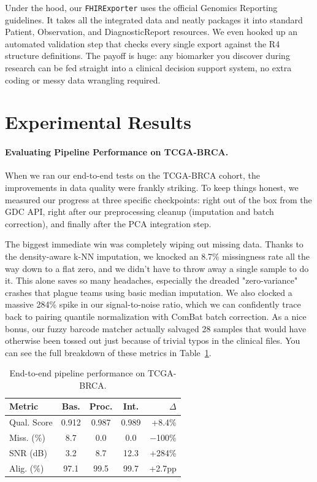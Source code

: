 \documentclass[runningheads]{llncs}
\begin{document}
Under the hood, our \texttt{FHIRExporter} uses the official Genomics Reporting guidelines. It takes all the integrated data and neatly packages it into standard Patient, Observation, and DiagnosticReport resources. We even hooked up an automated validation step that checks every single export against the R4 structure definitions. The payoff is huge: any biomarker you discover during research can be fed straight into a clinical decision support system, no extra coding or messy data wrangling required.

\section{Experimental Results}

\paragraph{Evaluating Pipeline Performance on TCGA-BRCA.}
When we ran our end-to-end tests on the TCGA-BRCA cohort, the improvements in data quality were frankly striking. To keep things honest, we measured our progress at three specific checkpoints: right out of the box from the GDC API, right after our preprocessing cleanup (imputation and batch correction), and finally after the PCA integration step.

The biggest immediate win was completely wiping out missing data. Thanks to the density-aware k-NN imputation, we knocked an 8.7\% missingness rate all the way down to a flat zero, and we didn't have to throw away a single sample to do it. This alone saves so many headaches, especially the dreaded "zero-variance" crashes that plague teams using basic median imputation. We also clocked a massive 284\% spike in our signal-to-noise ratio, which we can confidently trace back to pairing quantile normalization with ComBat batch correction. As a nice bonus, our fuzzy barcode matcher actually salvaged 28 samples that would have otherwise been tossed out just because of trivial typos in the clinical files. You can see the full breakdown of these metrics in Table~\ref{tab:results}.

\begin{table}[H]
\caption{End-to-end pipeline performance on TCGA-BRCA.}\label{tab:results}
\centering
\small
\setlength{\tabcolsep}{3pt}
\begin{tabular}{l c c c r}
\toprule
\textbf{Metric} & \textbf{Bas.} & \textbf{Proc.} & \textbf{Int.} & \textbf{$\Delta$} \\
\midrule
Qual. Score     & 0.912     & 0.987     & 0.989     & +8.4\% \\
Miss. (\%)      & 8.7       & 0.0       & 0.0       & $-$100\% \\
SNR (dB)        & 3.2       & 8.7       & 12.3      & +284\% \\
Alig. (\%)      & 97.1      & 99.5      & 99.7      & +2.7pp \\
\bottomrule
\end{tabular}
\end{table}
\end{document}
